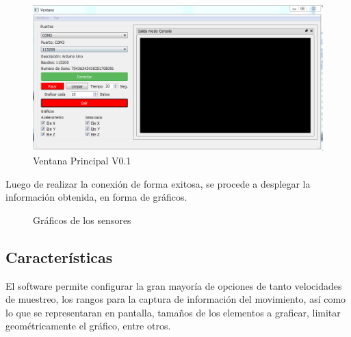 \documentclass[12pt,a4paper]{article}
\begin{document}
\begin{figure}[H]
\centering
  \includegraphics[scale=0.6]{images/mainwindow}
  \caption{Ventana Principal V0.1}
  \label{fig:mainwindow}
\end{figure}

Luego de realizar la conexión de forma exitosa, se procede a desplegar la información obtenida, en forma de gráficos.

\begin{figure}[H]
\centering
  \caption{Gráficos de los sensores}
  \label{fig:Graficosensores}
\end{figure}



\subsection{Características}
El software permite configurar la gran mayoría de opciones de tanto velocidades de muestreo, los rangos para la captura de información del movimiento, así como lo que se representaran en pantalla, tamaños de los elementos a graficar, limitar geométricamente el gráfico, entre otros.
\end{document}
